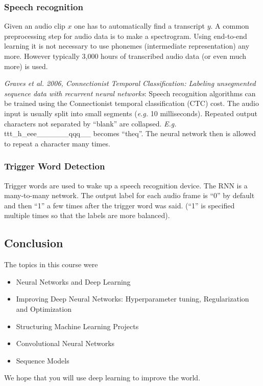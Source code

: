 \documentclass{article}
\begin{document}
\subsubsection{Speech recognition}
Given an audio clip $x$ one has to automatically find a transcript $y$.
A common preprocessing step for audio data is to make a spectrogram.
Using end-to-end learning it is not necessary to use phonemes (intermediate representation) any more.
However typically 3,000 hours of transcribed audio data (or even much more) is used.

\emph{Graves et al. 2006, Connectionist Temporal Classification: Labeling unsegmented sequence data with recurrent neural networks}:
Speech recognition algorithms can be trained using the Connectionist temporal classification (CTC) cost.
The audio input is usually split into small segments (\emph{e.g.} 10 milliseconds).
Repeated output characters not separated by ``blank'' are collapsed.
\emph{E.g.} ttt\_h\_eee\_\_\_\textvisiblespace\_\_\_qqq\_\_ becomes ``the\textvisiblespace q''.
The neural network then is allowed to repeat a character many times.

\subsubsection{Trigger Word Detection}
Trigger words are used to wake up a speech recognition device.
The RNN is a many-to-many network.
The output label for each audio frame is ``0'' by default and then ``1'' a few times after the trigger word was said.
(``1'' is specified multiple times so that the labels are more balanced).

\subsection{Conclusion}
The topics in this course were
\begin{itemize}
  \item Neural Networks and Deep Learning
  \item Improving Deep Neural Networks: Hyperparameter tuning, Regularization and Optimization
  \item Structuring Machine Learning Projects
  \item Convolutional Neural Networks
  \item Sequence Models
\end{itemize}
We hope that you will use deep learning to improve the world.

\appendix
\end{document}

